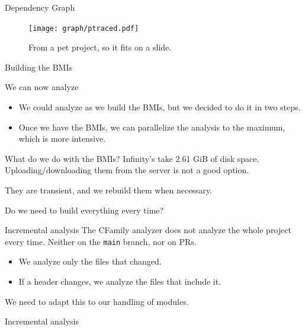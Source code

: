 \documentclass[aspectratio=169]{beamer}
\begin{document}
\begin{frame}{Dependency Graph}
  \begin{figure}
    \texttt{[image: graph/ptraced.pdf]}
    \caption*{\footnotesize From a pet project, so it fits on a slide.}
  \end{figure}
\end{frame}

\begin{frame}{Building the BMIs}
\end{frame}

\begin{frame}{We can now analyze}
  \begin{itemize}
    \item We could analyze as we build the BMIs, but we decided to do it in two steps.
    \item Once we have the BMIs, we can parallelize the analysis to the maximum, which is more intensive.
  \end{itemize}
  \begin{block}{What do we do with the BMIs?}
    Infinity's take 2.61 GiB of disk space. Uploading/downloading them from the server is not a good option.

    They are transient, and we rebuild them when necessary.
  \end{block}
\end{frame}

\begin{frame}{Do we need to build everything every time?}
  \begin{block}{Incremental analysis}
    The CFamily analyzer does not analyze the whole project every time.
    Neither on the \texttt{main} branch, nor on PRs.
    \begin{itemize}
      \item We analyze only the files that changed.
      \item If a header changes, we analyze the files that include it.
    \end{itemize}
    We need to adapt this to our handling of modules.
  \end{block}
\end{frame}

\begin{frame}{Incremental analysis}
\end{frame}
\end{document}
